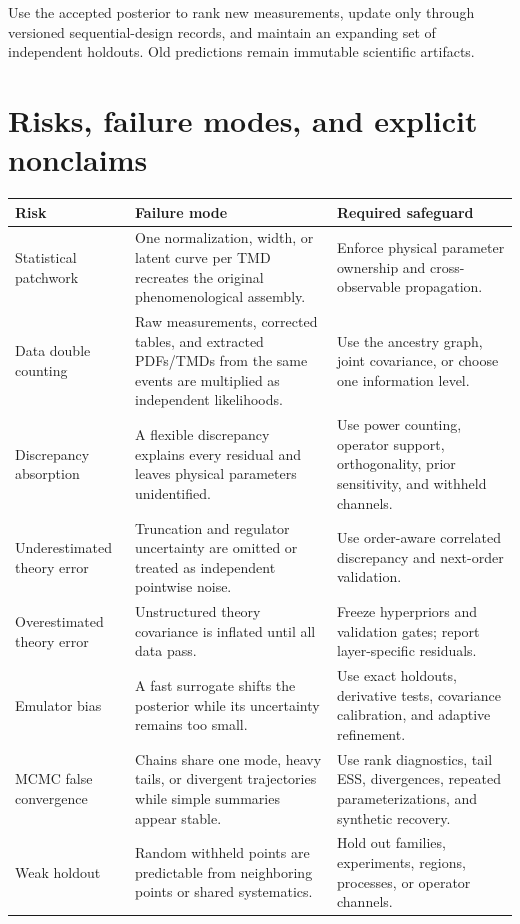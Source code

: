 \documentclass[11pt]{article}
\begin{document}
Use the accepted posterior to rank new measurements, update only through
versioned sequential-design records, and maintain an expanding set of
independent holdouts.  Old predictions remain immutable scientific artifacts.

\section{Risks, failure modes, and explicit nonclaims}
\label{sec:risks}

\begin{longtable}{L{0.22\textwidth}L{0.32\textwidth}L{0.37\textwidth}}
\toprule
Risk & Failure mode & Required safeguard\\
\midrule
\endhead
Statistical patchwork &
One normalization, width, or latent curve per TMD recreates the original
phenomenological assembly. &
Enforce physical parameter ownership and cross-observable propagation.\\
Data double counting &
Raw measurements, corrected tables, and extracted PDFs/TMDs from the same
events are multiplied as independent likelihoods. &
Use the ancestry graph, joint covariance, or choose one information level.\\
Discrepancy absorption &
A flexible discrepancy explains every residual and leaves physical parameters
unidentified. &
Use power counting, operator support, orthogonality, prior sensitivity, and
withheld channels.\\
Underestimated theory error &
Truncation and regulator uncertainty are omitted or treated as independent
pointwise noise. &
Use order-aware correlated discrepancy and next-order validation.\\
Overestimated theory error &
Unstructured theory covariance is inflated until all data pass. &
Freeze hyperpriors and validation gates; report layer-specific residuals.\\
Emulator bias &
A fast surrogate shifts the posterior while its uncertainty remains too small. &
Use exact holdouts, derivative tests, covariance calibration, and adaptive
refinement.\\
MCMC false convergence &
Chains share one mode, heavy tails, or divergent trajectories while simple
summaries appear stable. &
Use rank diagnostics, tail ESS, divergences, repeated parameterizations, and
synthetic recovery.\\
Weak holdout &
Random withheld points are predictable from neighboring points or shared
systematics. &
Hold out families, experiments, regions, processes, or operator channels.\\

\end{longtable}
\end{document}
